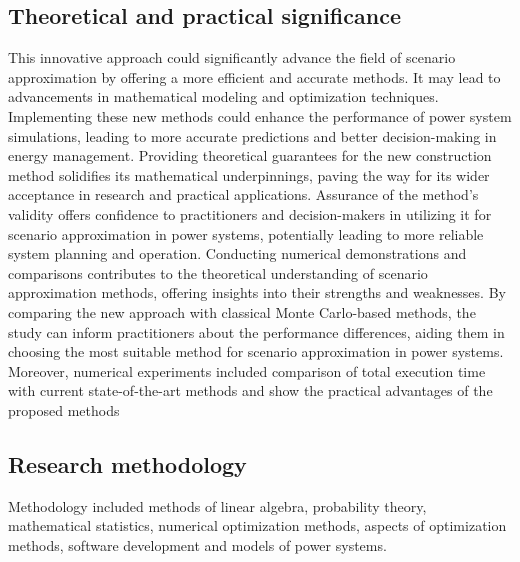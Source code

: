 \subsection*{Theoretical and practical significance}
This innovative approach could significantly advance the field of scenario approximation by offering a more efficient and accurate methods. It may lead to advancements in mathematical modeling and optimization techniques. Implementing these new methods could enhance the performance of power system simulations, leading to more accurate predictions and better decision-making in energy management. Providing theoretical guarantees for the new construction method solidifies its mathematical underpinnings, paving the way for its wider acceptance in research and practical applications. Assurance of the method's validity offers confidence to practitioners and decision-makers in utilizing it for scenario approximation in power systems, potentially leading to more reliable system planning and operation. Conducting numerical demonstrations and comparisons contributes to the theoretical understanding of scenario approximation methods, offering insights into their strengths and weaknesses. By comparing the new approach with classical Monte Carlo-based methods, the study can inform practitioners about the performance differences, aiding them in choosing the most suitable method for scenario approximation in power systems. Moreover, numerical experiments included comparison of total execution time with current state-of-the-art methods and show the practical advantages of the proposed methods

\subsection*{Research methodology}
Methodology included methods of linear algebra, probability theory, mathematical statistics, numerical optimization methods, aspects of optimization methods, software development and models of power systems.
